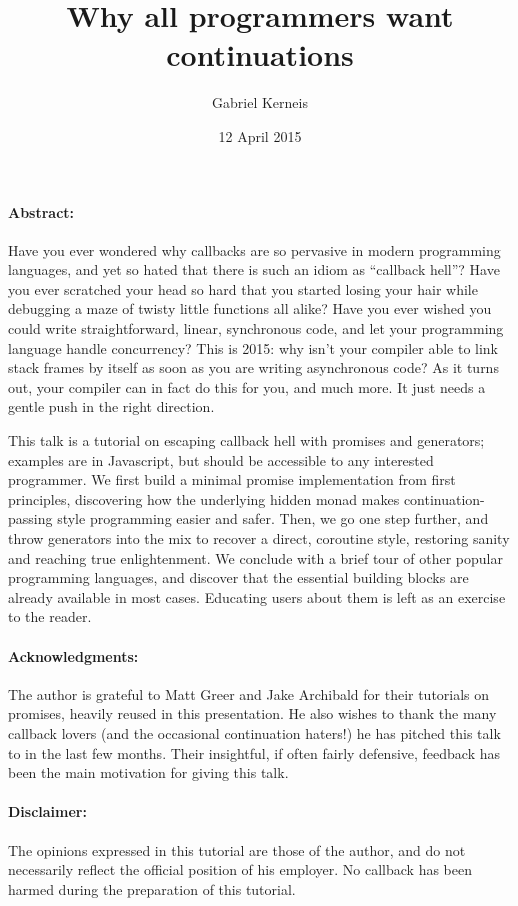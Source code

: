 \documentclass{article}
\title{Why all programmers want continuations\\\vspace{2mm}{\large (but use callbacks instead)}}
\author{Gabriel Kerneis}
\date{12 April 2015}
\begin{document}
\pagestyle{plain}


\maketitle

\paragraph{Abstract:}
%
Have you ever wondered why callbacks are so pervasive in modern programming
languages, and yet so hated that there is such an idiom as ``callback hell''?
Have you ever scratched your head so hard that you started losing your hair
while debugging a maze of twisty little functions all alike? Have you ever
wished you could write straightforward, linear, synchronous code, and let your
programming language handle concurrency? This is 2015: why isn't your compiler
able to link stack frames by itself as soon as you are writing asynchronous
code? As it turns out, your compiler can in fact do this for you, and much
more. It just needs a gentle push in the right direction.

This talk is a tutorial on escaping callback hell with promises and generators;
examples are in Javascript, but should be accessible to any interested
programmer.  We first build a minimal promise implementation from first
principles, discovering how the underlying hidden monad makes
continuation-passing style programming easier and safer.  Then, we go one step
further, and throw generators into the mix to recover a direct, coroutine
style, restoring sanity and reaching true enlightenment. We conclude with a
brief tour of other popular programming languages, and discover that the essential
building blocks are already available in most cases. Educating users about them
is left as an exercise to the reader.

\paragraph{Acknowledgments:}
%
The author is grateful to Matt Greer and Jake Archibald for their tutorials on
promises, heavily reused in this presentation. He also wishes to thank the many
callback lovers (and the occasional continuation haters!) he has pitched this
talk to in the last few months. Their insightful, if often fairly defensive,
feedback has been the main motivation for giving this talk.


{\small
\paragraph{Disclaimer:}
%
The opinions expressed in this tutorial are those of the author, and do not
necessarily reflect the official position of his employer.  No callback has
been harmed during the preparation of this tutorial.}
\end{document}
